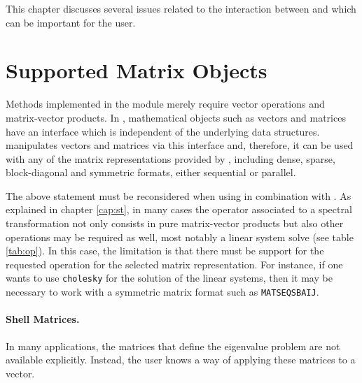 	This chapter discusses several issues related to the interaction between \slepc and \petsc{} which can be important for the user.


\section{Supported Matrix Objects}
\label{sec:supported}

	Methods implemented in the  module merely require vector operations and matrix-vector products. In \petsc, mathematical objects such as vectors and matrices have an interface which is independent of the underlying data structures. \slepc manipulates vectors and matrices via this interface and, therefore, it can be used with any of the matrix representations provided by \petsc, including dense, sparse, block-diagonal and symmetric formats, either sequential or parallel.

	The above statement must be reconsidered when using  in combination with . As explained in chapter \ref{cap:st}, in many cases the operator associated to a spectral transformation not only consists in pure matrix-vector products but also other operations may be required as well, most notably a linear system solve (see table \ref{tab:op}). In this case, the limitation is that there must be support for the requested operation for the selected matrix representation. For instance, if one wants to use \texttt{cholesky} for the solution of the linear systems, then it may be necessary to work with a symmetric matrix format such as \texttt{MATSEQSBAIJ}.

\paragraph{Shell Matrices.}

	In many applications, the matrices that define the eigenvalue problem are not available explicitly. Instead, the user knows a way of applying these matrices to a vector.

